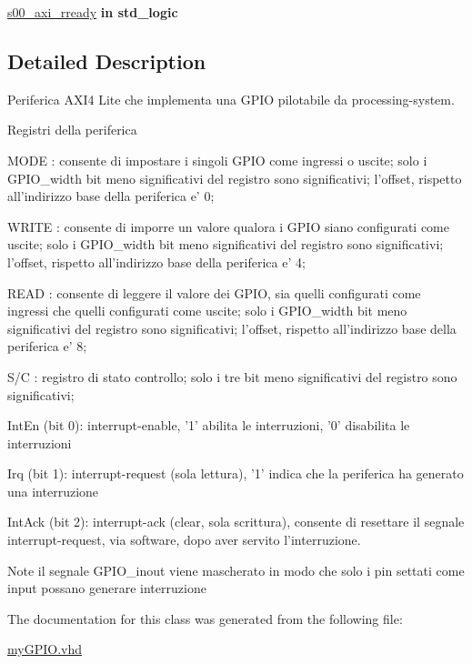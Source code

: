\begin{DoxyCompactItemize}
\item 
\hypertarget{classmy_g_p_i_o_ga8b82eb165d7024f6c7b25646f6ebdd4d}{\hyperlink{group__my_g_p_i_o_ga8b82eb165d7024f6c7b25646f6ebdd4d}{s00\+\_\+axi\+\_\+rready}  {\bfseries {\bfseries \textcolor{vhdlchar}{in}\textcolor{vhdlchar}{ }}} {\bfseries \textcolor{vhdlchar}{std\+\_\+logic}\textcolor{vhdlchar}{ }} }\label{classmy_g_p_i_o_ga8b82eb165d7024f6c7b25646f6ebdd4d}

\end{DoxyCompactItemize}


\subsection{Detailed Description}
Periferica A\+X\+I4 Lite che implementa una G\+P\+I\+O pilotabile da processing-\/system. 

Registri della periferica
\begin{DoxyItemize}
\item M\+O\+D\+E \+: consente di impostare i singoli G\+P\+I\+O come ingressi o uscite; solo i G\+P\+I\+O\+\_\+width bit meno significativi del registro sono significativi; l'offset, rispetto all'indirizzo base della periferica e' 0;
\item W\+R\+I\+T\+E \+: consente di imporre un valore qualora i G\+P\+I\+O siano configurati come uscite; solo i G\+P\+I\+O\+\_\+width bit meno significativi del registro sono significativi; l'offset, rispetto all'indirizzo base della periferica e' 4;
\item R\+E\+A\+D \+: consente di leggere il valore dei G\+P\+I\+O, sia quelli configurati come ingressi che quelli configurati come uscite; solo i G\+P\+I\+O\+\_\+width bit meno significativi del registro sono significativi; l'offset, rispetto all'indirizzo base della periferica e' 8;
\item S/\+C \+: registro di stato controllo; solo i tre bit meno significativi del registro sono significativi;
\begin{DoxyItemize}
\item Int\+En (bit 0)\+: interrupt-\/enable, '1' abilita le interruzioni, '0' disabilita le interruzioni
\item Irq (bit 1)\+: interrupt-\/request (sola lettura), '1' indica che la periferica ha generato una interruzione
\item Int\+Ack (bit 2)\+: interrupt-\/ack (clear, sola scrittura), consente di resettare il segnale interrupt-\/request, via software, dopo aver servito l'interruzione.
\end{DoxyItemize}
\end{DoxyItemize}

\begin{DoxyNote}{Note}
il segnale G\+P\+I\+O\+\_\+inout viene mascherato in modo che solo i pin settati come input possano generare interruzione 
\end{DoxyNote}


The documentation for this class was generated from the following file\+:\begin{DoxyCompactItemize}
\item 
\hyperlink{my_g_p_i_o_8vhd}{my\+G\+P\+I\+O.\+vhd}\end{DoxyCompactItemize}
